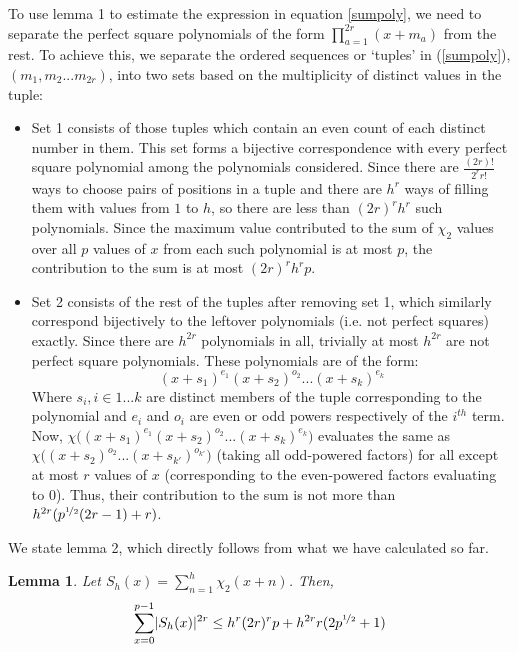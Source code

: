 \documentclass{report}
\newtheorem{lemma}{Lemma}
\begin{document}
To use lemma 1 to estimate the expression in equation \ref{sumpoly}, we need to separate the perfect square polynomials of the form $\prod_{a=1}^{2r}(x+m_a)$ from the rest. To achieve this, we separate the ordered sequences or `tuples' in (\ref{sumpoly}), $(m_1, m_2...m_{2r})$, into two sets based on the multiplicity of distinct values in the tuple:
\begin{itemize}
  \item Set 1 consists of those tuples which contain an even count of each distinct number in them. This set forms a bijective correspondence with every perfect square polynomial among the polynomials considered. Since there are $\frac{(2r)!}{2^rr!}$ ways to choose pairs of positions in a tuple and there are $h^{r}$ ways of filling them with values from $1$ to $h$, so there are less than $(2r)^r h^{r}$ such polynomials. Since the maximum value contributed to the sum of $\chi_2$ values over all $p$ values of $x$ from each such polynomial is at most $p$, the contribution to the sum is at most $(2r)^r h^{r}p$.
  \item Set 2 consists of the rest of the tuples after removing set 1, which similarly correspond bijectively to the leftover polynomials (i.e. not perfect squares) exactly. Since there are $h^{2r}$ polynomials in all, trivially at most $h^{2r}$ are not perfect square polynomials. These polynomials are of the form:
  $$(x+s_1)^{e_1}(x+s_2)^{o_2}...(x+s_k)^{e_k}$$
  Where $s_i, i\in 1...k$ are distinct members of the tuple corresponding to the polynomial and $e_i$ and $o_i$ are even or odd powers respectively of the $i^{th}$ term. Now, $\chi\big((x+s_1)^{e_1}(x+s_2)^{o_2}...(x+s_k)^{e_k}\big)$ evaluates the same as $\chi\big((x+s_2)^{o_2}...(x+s_{k'})^{o_{k'}}\big)$ (taking all odd-powered factors) for all except at most $r$ values of $x$ (corresponding to the even-powered factors evaluating to $0$). Thus, their contribution to the sum is not more than $h^{2r}(p^{\nicefrac{1}{2}}(2r-1)+r)$.
\end{itemize}
%
We state lemma 2, which directly follows from what we have calculated so far.
%
\begin{lemma} \label{lemma2statement}
Let $S_h(x)=\sum\limits_{n=1}^{h}\chi_2(x+n)$. Then,
\begin{equation} \label{lemma2}
\sum\limits_{x=0}^{p-1}\lvert S_h(x)\rvert ^{2r}\leq h^{r}(2r)^{r}p+h^{2r}r(2p^{\nicefrac{1}{2}}+1)
\end{equation}
\end{lemma}
\end{document}
